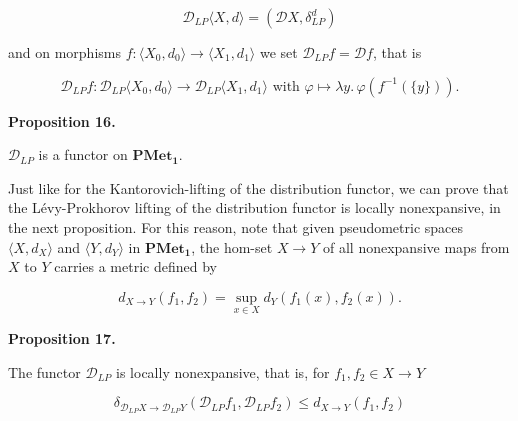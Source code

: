 \par  \quad  \[\mathcal{D}_{LP}\langle X,d\rangle=(\mathcal{D}X,\delta^{d}_{LP})\]\quad  \quad  
  
and on morphisms $f\colon\langle X_{0},d_{0}\rangle\to\langle X_{1},d_{1}\rangle$ we set $\mathcal{D}_{LP}f=\mathcal{D}f$, that is\par
  
\par  \quad  \[\mathcal{D}_{LP}f\colon\mathcal{D}_{LP}\langle X_{0},d_{0}\rangle\to\mathcal{D}_{LP}\langle X_{1},d_{1}\rangle\textrm{ with }\varphi\mapsto\lambda y.\,\varphi(f^{-1}(\{y\})).\]\quad  \quad  
  
 
 
\par\medskip\noindent\textbf{Proposition 16.}\par
 
 
$\mathcal{D}_{LP}$ is a functor on $\mathbf{PMet_{1}}$.\par
 
 
 
 
Just like for the Kantorovich-lifting of the distribution functor, we can prove that the Lévy-Prokhorov lifting of the distribution functor is locally nonexpansive, in the next proposition. For this reason, note that given pseudometric spaces $\langle X,d_{X}\rangle$ and $\langle Y,d_{Y}\rangle$ in $\mathbf{PMet_{1}}$, the hom-set $X\to Y$ of all nonexpansive maps from $X$ to $Y$ carries a metric defined by\par
  
\par  \quad  \[d_{X\to Y}(f_{1},f_{2})=\sup_{x\in X}d_{Y}(f_{1}(x),f_{2}(x)).\]\quad  \quad  
  
 
 
\par\medskip\noindent\textbf{Proposition 17.}\par
 
 
The functor $\mathcal{D}_{LP}$ is locally nonexpansive, that is, for $f_{1},f_{2}\in X\to Y$\par
  
\par  \quad  \[\delta_{\mathcal{D}_{LP}X\to\mathcal{D}_{LP}Y}(\mathcal{D}_{LP}f_{1},\mathcal{D}_{LP}f_{2})\leq d_{X\to Y}(f_{1},f_{2})\]\quad  \quad  
  
